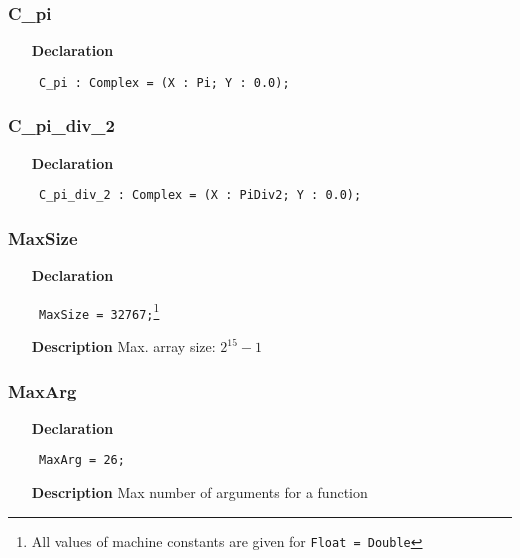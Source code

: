 \documentclass[12pt,a4paper,oneside]{report}
\newcommand{\declarationitem}[1]{\textbf{#1}}
\newcommand{\descriptiontitle}[1]{\textbf{#1}}
\newcommand{\code}[1]{\texttt{#1}}
\begin{document}
\subsubsection{C{\_}pi}
\label{utypes-C_pi}
\begin{itemize}\item[\declarationitem{Declaration}\hfill]
	\begin{flushleft}
		\code{
			C{\_}pi       : Complex = (X : Pi;     Y : 0.0);}
		
	\end{flushleft}
	
\end{itemize}
\subsubsection{C{\_}pi{\_}div{\_}2}
\label{utypes-C_pi_div_2}
\begin{itemize}\item[\declarationitem{Declaration}\hfill]
	\begin{flushleft}
		\code{
			C{\_}pi{\_}div{\_}2 : Complex = (X : PiDiv2; Y : 0.0);}
		
	\end{flushleft}
	
\end{itemize}
\subsubsection{MaxSize}
\label{utypes-MaxSize}
\begin{itemize}\item[\declarationitem{Declaration}\hfill]
	\begin{flushleft}
		\code{
			MaxSize = 32767;}\footnote{All values of machine constants are given for \code{Float = Double}}
		
	\end{flushleft}
	
	\par
	\item[\descriptiontitle{Description}]
	Max. array size: $2^{15}-1$
	
\end{itemize}
\subsubsection{MaxArg}
\label{utypes-MaxArg}
\begin{itemize}\item[\declarationitem{Declaration}\hfill]
	\begin{flushleft}
		\code{
			MaxArg = 26;}
		
	\end{flushleft}
	
	\par
	\item[\descriptiontitle{Description}]
	Max number of arguments for a function
\end{itemize}
\end{document}
